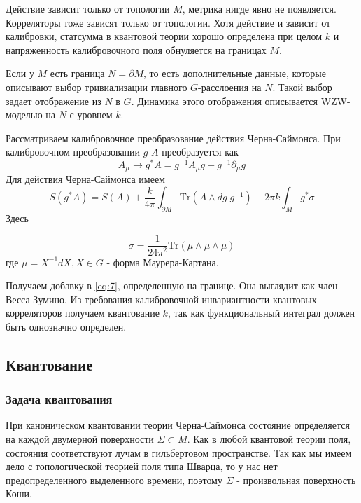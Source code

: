 \documentclass[a4paper,12pt]{article}
\theoremstyle{definition} \newtheorem{Def}{Definition}
\begin{document}
Действие зависит только от топологии $M$, метрика нигде явно не появляется. Корреляторы тоже зависят только от топологии.
Хотя действие и зависит от калибровки, статсумма в квантовой теории хорошо определена при целом $k$ и напряженность калибровочного поля обнуляется на границах $M$.

Если у $M$ есть граница $N=\partial M$, то есть дополнительные данные, которые описывают выбор тривиализации главного $G$-расслоения на $N$. Такой выбор задает отображение из $N$ в $G$. Динамика этого отображения описывается WZW-моделью на $N$ с уровнем $k$.

Рассматриваем калибровочное преобразование действия Черна-Саймонса.
При калибровочном преобразовании $g$ $A$ преобразуется как
\begin{equation}
  \label{eq:5}
  A_{\mu}\to g^* A= g^{-1}A_{\mu}g+g^{-1}\partial_{\mu}g
\end{equation}
Для действия Черна-Саймонса имеем
\begin{equation}
  \label{eq:7}
  S(g^* A)=S(A) +\frac{k}{4\pi}\int_{\partial M}\mathrm{Tr} (A\wedge dg \; g^{-1})-2\pi k\int_M g^* \sigma
\end{equation}
Здесь

\begin{equation}
  \label{eq:101}
  \sigma=\frac{1}{24\pi^2} \mathrm{Tr} (\mu\wedge\mu\wedge\mu)
\end{equation}
где $\mu=X^{-1} dX, X\in G$ - форма Маурера-Картана.

Получаем добавку в \eqref{eq:7}, определенную на границе. Она выглядит как член Весса-Зумино. Из требования калибровочной инвариантности квантовых корреляторов получаем квантование $k$, так как функциональный интеграл должен быть однозначно определен.

\subsection{Квантование}
\label{sec:quantization}

\subsubsection{Задача квантования}
\label{sec:task}

При каноническом квантовании теории Черна-Саймонса состояние определяется на каждой двумерной поверхности $\Sigma\subset M$. Как в любой квантовой теории поля, состояния соответствуют лучам в гильбертовом пространстве. Так как мы имеем дело с топологической теорией поля типа Шварца, то у нас нет предопределенного выделенного времени, поэтому $\Sigma$ - произвольная поверхность Коши.
\end{document}
